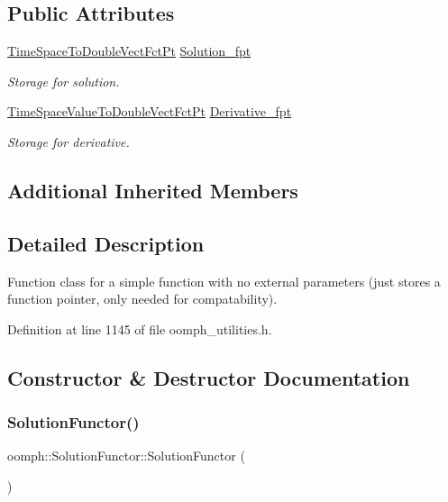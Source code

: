 \subsection*{Public Attributes}
\begin{DoxyCompactItemize}
\item 
\hyperlink{classoomph_1_1SolutionFunctorBase_a6df07384ce36c784c7befe7d7bf4a606}{Time\+Space\+To\+Double\+Vect\+Fct\+Pt} \hyperlink{classoomph_1_1SolutionFunctor_ac00dd4dd85c4e9fedc87fdbc15537c42}{Solution\+\_\+fpt}
\begin{DoxyCompactList}\small\item\em Storage for solution. \end{DoxyCompactList}\item 
\hyperlink{classoomph_1_1SolutionFunctorBase_aca237d543e590a388b771aea22d3aad6}{Time\+Space\+Value\+To\+Double\+Vect\+Fct\+Pt} \hyperlink{classoomph_1_1SolutionFunctor_a7ebbf961369283ab1f9a0cf54c841e46}{Derivative\+\_\+fpt}
\begin{DoxyCompactList}\small\item\em Storage for derivative. \end{DoxyCompactList}\end{DoxyCompactItemize}
\subsection*{Additional Inherited Members}


\subsection{Detailed Description}
Function class for a simple function with no external parameters (just stores a function pointer, only needed for compatability). 

Definition at line 1145 of file oomph\+\_\+utilities.\+h.



\subsection{Constructor \& Destructor Documentation}
\mbox{\label{classoomph_1_1SolutionFunctor_a38ef9471c4f57552b50236c4598349b0}} 
\subsubsection{\texorpdfstring{Solution\+Functor()}{SolutionFunctor()}\hspace{0.1cm}{\footnotesize\ttfamily [1/4]}}
{\footnotesize\ttfamily oomph\+::\+Solution\+Functor\+::\+Solution\+Functor (\begin{DoxyParamCaption}{ }\end{DoxyParamCaption})\hspace{0.3cm}{\ttfamily [inline]}}




